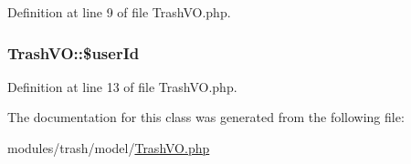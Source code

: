 Definition at line 9 of file Trash\+V\+O.\+php.

\hypertarget{classTrashVO_a346f371317bde03b5a209e00cb33a603}{}
\subsubsection[{\$user\+Id}]{\setlength{\rightskip}{0pt plus 5cm}Trash\+V\+O\+::\$user\+Id}\label{classTrashVO_a346f371317bde03b5a209e00cb33a603}


Definition at line 13 of file Trash\+V\+O.\+php.



The documentation for this class was generated from the following file\+:\begin{DoxyCompactItemize}
\item 
modules/trash/model/\hyperlink{TrashVO_8php}{Trash\+V\+O.\+php}\end{DoxyCompactItemize}
